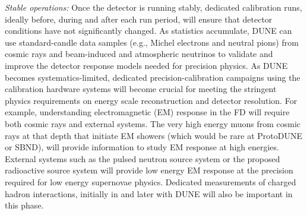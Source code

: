 \textit{Stable operations:} Once the detector is running stably, dedicated calibration runs, ideally before, during and after each run period, will ensure that detector conditions have not significantly changed.
As statistics accumulate, DUNE can use standard-candle data samples (e.g., Michel electrons and neutral pions) from cosmic rays and beam-induced and atmospheric neutrinos to validate and improve the detector response models needed for precision physics. 
As DUNE becomes systematics-limited, dedicated precision-calibration campaigns using the calibration hardware systems will become crucial for meeting the stringent physics requirements on energy scale reconstruction and detector resolution. For example, understanding electromagnetic (EM) response in the FD will require both cosmic rays
and external systems. The very high energy muons from cosmic rays at that depth that initiate
EM showers (which would be rare at ProtoDUNE or SBND), will provide information to study EM response at high energies. External systems such as the pulsed neutron source system or the proposed radioactive source system will provide low energy EM response at the precision required for low energy supernovae
physics. Dedicated measurements of charged hadron interactions, initially in  and later with DUNE  will also be important in this phase.


